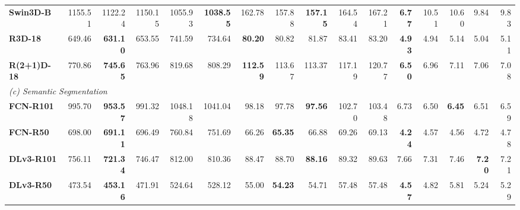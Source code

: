 \begin{table}[t]
{\begin{tabular}{lrrrrrrrrrrrrrrr}
\textbf{Swin3D-B} & 1155.51 & 1122.24 & 1150.15 & 1055.93 & \cellcolor{green!15}\textbf{1038.55} & 162.78 & 157.88 & \cellcolor{green!15}\textbf{157.15} & 164.54 & 167.21 & \cellcolor{green!15}\textbf{6.77} & 10.51 & 10.60 & 9.84 & 9.83 \\
\textbf{R3D-18} & 649.46 & \cellcolor{green!15}\textbf{631.10} & 653.55 & 741.59 & 734.64 & \cellcolor{green!15}\textbf{80.20} & 80.82 & 81.87 & 83.41 & 83.20 & \cellcolor{green!15}\textbf{4.93} & 4.94 & 5.14 & 5.04 & 5.11 \\
\textbf{R(2+1)D-18} & 770.86 & \cellcolor{green!15}\textbf{745.65} & 763.96 & 819.68 & 808.29 & \cellcolor{green!15}\textbf{112.59} & 113.67 & 113.37 & 117.19 & 120.77 & \cellcolor{green!15}\textbf{6.50} & 6.96 & 7.11 & 7.06 & 7.08 \\
\midrule
\multicolumn{16}{l}{\textit{(c) Semantic Segmentation}} \\
\midrule
\textbf{FCN-R101} & 995.70 & \cellcolor{green!15}\textbf{953.57} & 991.32 & 1048.18 & 1041.04 & 98.18 & 97.78 & \cellcolor{green!15}\textbf{97.56} & 102.70 & 103.48 & 6.73 & 6.50 & \cellcolor{green!15}\textbf{6.45} & 6.51 & 6.59 \\
\textbf{FCN-R50} & 698.00 & \cellcolor{green!15}\textbf{691.11} & 696.49 & 760.84 & 751.69 & 66.26 & \cellcolor{green!15}\textbf{65.35} & 66.88 & 69.26 & 69.13 & \cellcolor{green!15}\textbf{4.24} & 4.57 & 4.56 & 4.72 & 4.78 \\
\textbf{DLv3-R101} & 756.11 & \cellcolor{green!15}\textbf{721.34} & 746.47 & 812.00 & 810.36 & 88.47 & 88.70 & \cellcolor{green!15}\textbf{88.16} & 89.32 & 89.63 & 7.66 & 7.31 & 7.46 & \cellcolor{green!15}\textbf{7.20} & 7.21 \\
\textbf{DLv3-R50} & 473.54 & \cellcolor{green!15}\textbf{453.16} & 471.91 & 524.64 & 528.12 & 55.00 & \cellcolor{green!15}\textbf{54.23} & 54.71 & 57.48 & 57.48 & \cellcolor{green!15}\textbf{4.57} & 4.82 & 5.81 & 5.24 & 5.29 \\
\bottomrule
\end{tabular}%
}
\end{table}
